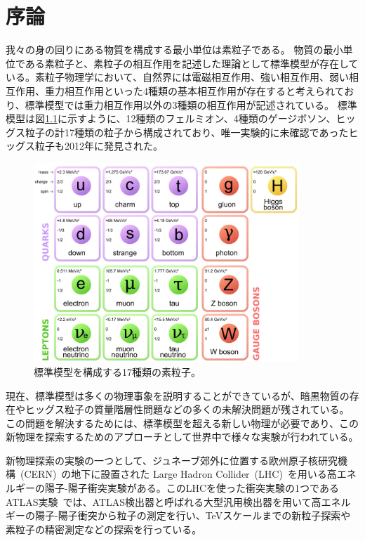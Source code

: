 \chapter{序論}
我々の身の回りにある物質を構成する最小単位は素粒子である。
物質の最小単位である素粒子と、素粒子の相互作用を記述した理論として標準模型が存在している。素粒子物理学において、自然界には電磁相互作用、強い相互作用、弱い相互作用、重力相互作用といった4種類の基本相互作用が存在すると考えられており、標準模型では重力相互作用以外の3種類の相互作用が記述されている。
標準模型は図\ref{fig:標準模型}に示すように、12種類のフェルミオン、4種類のゲージボソン、ヒッグス粒子の計17種類の粒子から構成されており、唯一実験的に未確認であったヒッグス粒子も2012年に発見された\cite{article:Higgs_boson}。
\begin{figure}[tb]
  \centering
  \includegraphics[clip, width=10cm]{fig/1/standardmodel.jpg}
  \caption{標準模型を構成する17種類の素粒子\cite{article:elementary_particles}。}
  \label{fig:標準模型}
\end{figure}

現在、標準模型は多くの物理事象を説明することができているが、暗黒物質の存在やヒッグス粒子の質量階層性問題などの多くの未解決問題が残されている。
この問題を解決するためには、標準模型を超える新しい物理が必要であり、この新物理を探索するためのアプローチとして世界中で様々な実験が行われている。

新物理探索の実験の一つとして、ジュネーブ郊外に位置する欧州原子核研究機構~(CERN)~\cite{article:CERN}の地下に設置された Large Hadron Collider~(LHC)~\cite{article:LHC}を用いる高エネルギーの陽子-陽子衝突実験がある。このLHCを使った衝突実験の1つであるATLAS実験~\cite{Aad:1129811}では、ATLAS検出器と呼ばれる大型汎用検出器を用いて高エネルギーの陽子-陽子衝突から粒子の測定を行い、TeVスケールまでの新粒子探索や素粒子の精密測定などの探索を行っている。


